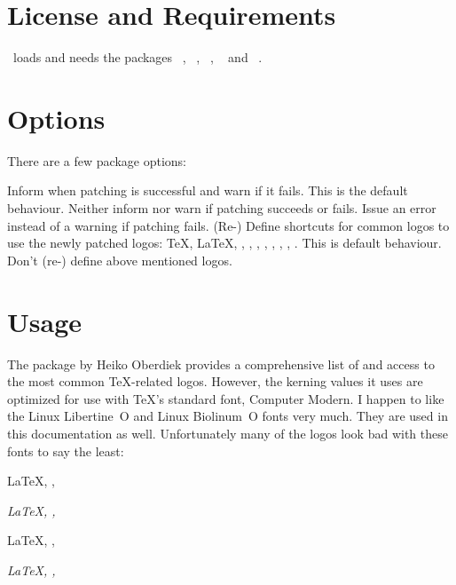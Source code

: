 \documentclass[load-preamble+]{cnltx-doc}
\begin{document}
\section{License and Requirements}
\license

\libertinehologopatch\ loads and needs the packages
~\cite{pkg:etoolbox}, ~\cite{pkg:hologo},
~\cite{pkg:ifxetex}, ~\cite{pkg:ifluatex} and
~\cite{pkg:libertine}.

\section{Options}
There are a few package options:
\begin{options}
    Inform when patching is successful and warn if it fails. This is the
    default behaviour.
    Neither inform nor warn if patching succeeds or fails.
    Issue an error instead of a warning if patching fails.
    (Re-) Define shortcuts for common logos to use the newly patched
     logos:  \TeX,  \LaTeX,  \LaTeXe,
     \LaTeXTeX,  \pdfTeX,  \pdfLaTeX,
     \XeTeX,  \XeLaTeX,  \LuaTeX,
     \LuaLaTeX. This is default behaviour.
    Don't (re-) define above mentioned logos.
\end{options}

\section{Usage}
The  package by Heiko Oberdiek provides a comprehensive list of
and access to the most common \TeX-related logos. However, the kerning values
it uses are optimized for use with \TeX's standard font, Computer Modern. I
happen to like the Linux Libertine~O and Linux Biolinum~O fonts very
much. They are used in this documentation as well. Unfortunately many of the
logos look bad with these fonts to say the least:

\begin{example}
  \restorelogos\huge
  \LaTeX, \XeLaTeX, \LaTeXTeX \par
  \textit{\LaTeX, \XeLaTeX, \LaTeXTeX}
 
  \sffamily
  \LaTeX, \XeLaTeX, \LaTeXTeX \par
  \textit{\LaTeX, \XeLaTeX, \LaTeXTeX}
\end{example}
\end{document}
